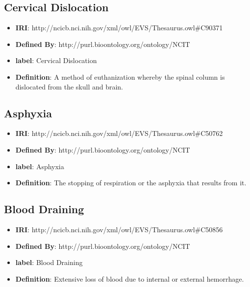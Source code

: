 \documentclass[a4paper,12pt,oneside]{article}
\begin{document}
  \subsection{Cervical Dislocation}
 
 \begin{itemize}
 	\item \textbf{IRI}:  	 	
 	http://ncicb.nci.nih.gov/xml/owl/EVS/Thesaurus.owl\#C90371
 	\item \textbf{Defined By}: http://purl.bioontology.org/ontology/NCIT
 	\item \textbf{label}: Cervical Dislocation
 	\item \textbf{Definition}: A method of euthanization whereby the spinal column is dislocated from the skull and brain.
 \end{itemize}  
 
   \subsection{Asphyxia}
 
 \begin{itemize}
 	\item \textbf{IRI}:  	 	
 	http://ncicb.nci.nih.gov/xml/owl/EVS/Thesaurus.owl\#C50762
 	\item \textbf{Defined By}: http://purl.bioontology.org/ontology/NCIT
 	\item \textbf{label}: Asphyxia
 	\item \textbf{Definition}: The stopping of respiration or the asphyxia that results from it.
 \end{itemize}  
  
    \subsection{Blood Draining}
  
  \begin{itemize}
  	\item \textbf{IRI}:  	 	
  	http://ncicb.nci.nih.gov/xml/owl/EVS/Thesaurus.owl\#C50856
  	\item \textbf{Defined By}: http://purl.bioontology.org/ontology/NCIT
  	\item \textbf{label}: Blood Draining
  	\item \textbf{Definition}: Extensive loss of blood due to internal or external hemorrhage.
  \end{itemize}  
  
  \nocite{JS06}

  \newpage
  \printbibliography
  
\end{document}

